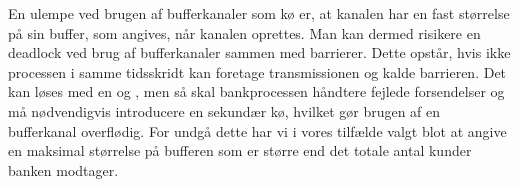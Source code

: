 En ulempe ved brugen af bufferkanaler som kø er, at kanalen har en fast størrelse på sin buffer, som 
angives, når kanalen oprettes. Man kan dermed risikere en deadlock ved brug af bufferkanaler sammen med barrierer. Dette opstår, hvis ikke processen i samme 
tidsskridt kan foretage transmissionen og kalde barrieren.
Det kan løses med en  og , men så 
skal bankprocessen håndtere fejlede forsendelser og må nødvendigvis introducere en 
sekundær kø, hvilket gør brugen af en bufferkanal overflødig. For undgå dette har vi i vores tilfælde valgt blot at 
angive en maksimal størrelse på bufferen som er større end det totale antal 
kunder banken modtager. 

